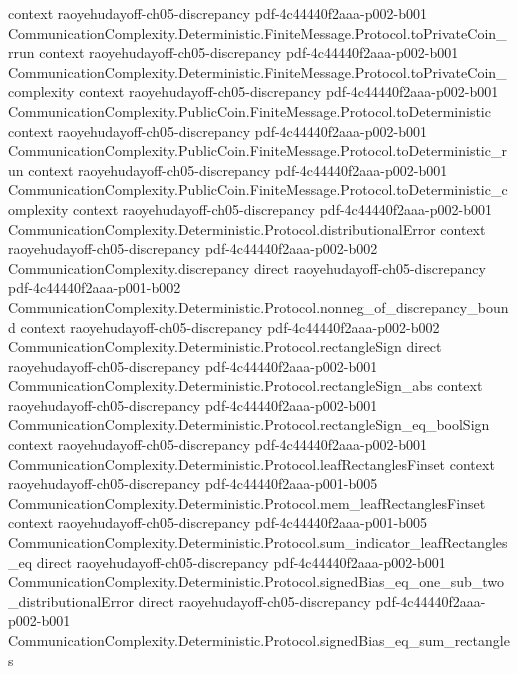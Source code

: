 \begin{theorem}
  {context}
  {raoyehudayoff-ch05-discrepancy}
  {pdf-4c44440f2aaa-p002-b001}
\proofstep
  {CommunicationComplexity.Deterministic.FiniteMessage.Protocol.toPrivateCoin_rrun}
  {context}
  {raoyehudayoff-ch05-discrepancy}
  {pdf-4c44440f2aaa-p002-b001}
\proofstep
  {CommunicationComplexity.Deterministic.FiniteMessage.Protocol.toPrivateCoin_complexity}
  {context}
  {raoyehudayoff-ch05-discrepancy}
  {pdf-4c44440f2aaa-p002-b001}
\proofstep
  {CommunicationComplexity.PublicCoin.FiniteMessage.Protocol.toDeterministic}
  {context}
  {raoyehudayoff-ch05-discrepancy}
  {pdf-4c44440f2aaa-p002-b001}
\proofstep
  {CommunicationComplexity.PublicCoin.FiniteMessage.Protocol.toDeterministic_run}
  {context}
  {raoyehudayoff-ch05-discrepancy}
  {pdf-4c44440f2aaa-p002-b001}
\proofstep
  {CommunicationComplexity.PublicCoin.FiniteMessage.Protocol.toDeterministic_complexity}
  {context}
  {raoyehudayoff-ch05-discrepancy}
  {pdf-4c44440f2aaa-p002-b001}
\proofstep
  {CommunicationComplexity.Deterministic.Protocol.distributionalError}
  {context}
  {raoyehudayoff-ch05-discrepancy}
  {pdf-4c44440f2aaa-p002-b002}
\proofstep
  {CommunicationComplexity.discrepancy}
  {direct}
  {raoyehudayoff-ch05-discrepancy}
  {pdf-4c44440f2aaa-p001-b002}
\proofstep
  {CommunicationComplexity.Deterministic.Protocol.nonneg_of_discrepancy_bound}
  {context}
  {raoyehudayoff-ch05-discrepancy}
  {pdf-4c44440f2aaa-p002-b002}
\proofstep
  {CommunicationComplexity.Deterministic.Protocol.rectangleSign}
  {direct}
  {raoyehudayoff-ch05-discrepancy}
  {pdf-4c44440f2aaa-p002-b001}
\proofstep
  {CommunicationComplexity.Deterministic.Protocol.rectangleSign_abs}
  {context}
  {raoyehudayoff-ch05-discrepancy}
  {pdf-4c44440f2aaa-p002-b001}
\proofstep
  {CommunicationComplexity.Deterministic.Protocol.rectangleSign_eq_boolSign}
  {context}
  {raoyehudayoff-ch05-discrepancy}
  {pdf-4c44440f2aaa-p002-b001}
\proofstep
  {CommunicationComplexity.Deterministic.Protocol.leafRectanglesFinset}
  {context}
  {raoyehudayoff-ch05-discrepancy}
  {pdf-4c44440f2aaa-p001-b005}
\proofstep
  {CommunicationComplexity.Deterministic.Protocol.mem_leafRectanglesFinset}
  {context}
  {raoyehudayoff-ch05-discrepancy}
  {pdf-4c44440f2aaa-p001-b005}
\proofstep
  {CommunicationComplexity.Deterministic.Protocol.sum_indicator_leafRectangles_eq}
  {direct}
  {raoyehudayoff-ch05-discrepancy}
  {pdf-4c44440f2aaa-p002-b001}
\proofstep
  {CommunicationComplexity.Deterministic.Protocol.signedBias_eq_one_sub_two_distributionalError}
  {direct}
  {raoyehudayoff-ch05-discrepancy}
  {pdf-4c44440f2aaa-p002-b001}
\proofstep
  {CommunicationComplexity.Deterministic.Protocol.signedBias_eq_sum_rectangles}

\end{theorem}

